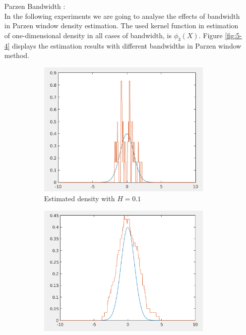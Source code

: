 \documentclass[12pt]{article}
\begin{document}
\begin{itemize}
\item[Parzen Bandwidth] :\\
In the following experiments we are going to analyse the effects of bandwidth in Parzen window density estimation. The used kernel function in estimation of one-dimensional density in all cases of bandwidth, is $\phi_3(X)$. Figure \ref{fig:5-4} displays the estimation results with different bandwidths in Parzen window method.

\begin{figure}[h]
\centering
\begin{subfigure}{0.45\textwidth}
\centering
\includegraphics[scale=0.35]{Imgs/5-4.png}
\caption{Estimated density with $H = 0.1$}
\end{subfigure}
\begin{subfigure}{0.45\textwidth}
\centering
\includegraphics[scale=0.35]{Imgs/5-3.png}

\end{subfigure}
\end{figure}
\end{itemize}
\end{document}
